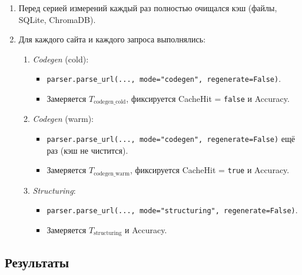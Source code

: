 \begin{enumerate}
    \item Перед серией измерений каждый раз полностью очищался кэш (файлы, SQLite, ChromaDB)\cite{SQLiteDocumentation}.
    \item Для каждого сайта и каждого запроса выполнялись:
    \begin{enumerate}
        \item \emph{Codegen} (cold):
        \begin{itemize}
            \item \texttt{parser.parse\_url(..., mode="codegen", regenerate=False)}.
            \item Замеряется $T_{\text{codegen\_cold}}$, фиксируется CacheHit = \texttt{false} и Accuracy.
        \end{itemize}
        \item \emph{Codegen} (warm):
        \begin{itemize}
            \item \texttt{parser.parse\_url(..., mode="codegen", regenerate=False)} ещё раз (кэш не чистится).
            \item Замеряется $T_{\text{codegen\_warm}}$, фиксируется CacheHit = \texttt{true} и Accuracy.
        \end{itemize}
        \item \emph{Structuring}:
        \begin{itemize}
            \item \texttt{parser.parse\_url(..., mode="structuring", regenerate=False)}.
            \item Замеряется $T_{\text{structuring}}$ и Accuracy.
        \end{itemize}
    \end{enumerate}
\end{enumerate}

\subsection{Результаты}

